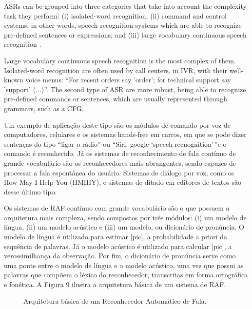\ac{ASR}s can be grouped into three categories that take into account the complexity task they perform: (i) isolated-word recognition; (ii) command and control systems, in other words, speech recognition systems which are able to recognize pre-defined sentences or expressions; and (iii) large vocabulary continuous speech recognition \cite{Rabiner1997}.

Large vocabulary continuous speech recognition is the most complex of them. 
Isolated-word recognition are often used by call centers, in \ac{IVR}, with their well-known voice menus: ``For recent orders say 'order'; for technical support say 'support' (...)''. The second type of \ac{ASR} are more robust, being able to recognize pre-defined commands or sentences, which are usually represented through grammars, such as a \ac{CFG}.


Um
exemplo de aplica\c{c}\~ao deste tipo s\~ao os m\'odulos de comando por voz de
computadores, celulares e os sistemas hands-free em carros, em que se
pode dizer senten\c{c}as do tipo ``ligar o r\'adio'' ou ``Siri, google `speech
recnognition'\,''e o comando \'e reconhecido. J\'a os sistemas de
reconhecimento de fala cont\'inuo de grande vocabul\'ario s\~ao os
reconhecedores mais abrangentes, sendo capazes de processar a fala
espont\^anea do usu\'ario. Sistemas de di\'alogo por voz, como os How May I
Help You (HMIHY), e sistemas de ditado em editores de textos s\~ao desse
\'ultimo tipo.

Os sistemas de RAF cont\'inuo com grande vocabul\'ario s\~ao o que possuem a arquitetura
mais complexa, sendo compostos por tr\^es m\'odulos: (i) um modelo de l\'ingua, (ii) um modelo ac\'ustico e (iii)
um modelo, ou dicion\'ario de pron\'uncia. O modelo de l\'ingua \'e utilizado
para estimar {[}pic{]}, a probabilidade a priori da sequ\^encia de
palavras. J\'a o modelo ac\'ustico \'e utilizado para calcular {[}pic{]}, a
verossimilhan\c{c}a da observa\c{c}\~ao. Por fim, o dicion\'ario de pron\'uncia serve
como uma ponte entre o modelo de l\'ingua e o modelo ac\'ustico, uma vez que
possui as palavras que comp\~oem o l\'exico do reconhecedor, transcritas em
forma ortogr\'afica e fon\'etica. A Figura 9 ilustra a arquitetura b\'asica de
um sistema de RAF.

\begin{figure}[!ht]
        \noindent{}
        \caption{Arquitetura b\'asica de um Reconhecedor Autom\'atico de Fala.}
        \label{fig:asr-architecture}
\end{figure}
 

